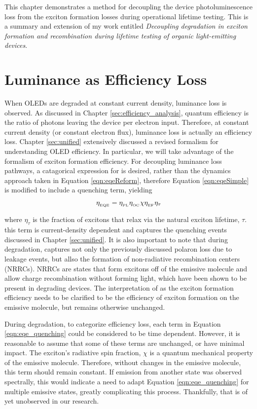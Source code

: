 \documentclass[../thesis.tex]{subfiles}
\begin{document}
This chapter demonstrates a method for decoupling the device photoluminescence loss from the exciton formation losses during operational lifetime testing.  
This is a summary and extension of my work entitled \textit{Decoupling degradation in exciton formation and recombination during lifetime testing of organic light-emitting devices}.\supercite{Hershey2017}


\section{Luminance as Efficiency Loss}

When OLEDs are degraded at constant current density, luminance loss is observed.  
As discussed in Chapter \ref{sec:efficiency_analysis}, quantum efficiency is the ratio of photons leaving the device per electron input.
Therefore, at constant current density (or constant electron flux), luminance loss is actually an efficiency loss.
Chapter \ref{sec:unified} extensively discussed a revised formalism for understanding OLED efficiency.
In particular, we will take advantage of the formalism of exciton formation efficiency.  
For decoupling luminance loss pathways, a catagorical expression for \eqe is desired, rather than the dynamics approach taken in Equation \ref{eqn:eqeReform}, therefore Equation \ref{eqn:eqeSimple} is modified to include a quenching term, yielding

\begin{equation}
\eta_{_\text{\tiny EQE}}=\eta_{_\text{\tiny PL}}\eta_{_\text{\tiny OC}}\chi\eta_{_\text{\tiny EF}}\eta_\tau
\label{eqn:eqe_quenching}
\end{equation}

where $\eta_\tau$ is the fraction of excitons that relax via the natural exciton lifetime, $\tau$.  
this term is current-density dependent and captures the quenching events discussed in Chapter \ref{sec:unified}.
It is also important to note that during degradation, \ef captures not only the previously discussed polaron loss due to leakage events, but allso the formation of non-radiative recombination centers (NRRCs).
NRRCs are states that form excitons off of the emissive molecule and allow charge recombination without forming light, which have been shown to be present in degrading devices.\supercite{Kondakov2003,Kondakov2007d}
The interpretation of \ef as the exciton formation efficiency needs to be clarified to be the efficiency of exciton formation on the emissive molecule, but remains otherwise unchanged.

During degradation, to categorize efficiency loss, each term in Equation \ref{eqn:eqe_quenching} could be considered to be time dependent.  
However, it is reasonable to assume that some of these terms are unchanged, or have minimal impact.
The exciton's radiative spin fraction, $\chi$ is a quantum mechanical property of the emissive molecule.
Therefore, without changes in the emissive molecule, this term should remain constant.  
If emission from another state was observed spectrally, this would indicate a need to adapt Equation \ref{eqn:eqe_quenching} for multiple emissive states, greatly complicating this process.
Thankfully, that is of yet unobserved in our research.
\end{document}
